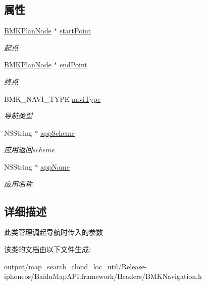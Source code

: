 \subsection*{属性}
\begin{DoxyCompactItemize}
\item 
\hypertarget{interface_b_m_k_navi_para_aafbed621fc51d1fe9a24b007f06635fb}{}\hyperlink{interface_b_m_k_plan_node}{B\+M\+K\+Plan\+Node} $\ast$ \hyperlink{interface_b_m_k_navi_para_aafbed621fc51d1fe9a24b007f06635fb}{start\+Point}\label{interface_b_m_k_navi_para_aafbed621fc51d1fe9a24b007f06635fb}

\begin{DoxyCompactList}\small\item\em 起点 \end{DoxyCompactList}\item 
\hypertarget{interface_b_m_k_navi_para_a6c47b9b500a1361c81843dde65b79928}{}\hyperlink{interface_b_m_k_plan_node}{B\+M\+K\+Plan\+Node} $\ast$ \hyperlink{interface_b_m_k_navi_para_a6c47b9b500a1361c81843dde65b79928}{end\+Point}\label{interface_b_m_k_navi_para_a6c47b9b500a1361c81843dde65b79928}

\begin{DoxyCompactList}\small\item\em 终点 \end{DoxyCompactList}\item 
\hypertarget{interface_b_m_k_navi_para_abbc3ff6ed83b98d211205ebf2153fe2b}{}B\+M\+K\+\_\+\+N\+A\+V\+I\+\_\+\+T\+Y\+P\+E \hyperlink{interface_b_m_k_navi_para_abbc3ff6ed83b98d211205ebf2153fe2b}{navi\+Type}\label{interface_b_m_k_navi_para_abbc3ff6ed83b98d211205ebf2153fe2b}

\begin{DoxyCompactList}\small\item\em 导航类型 \end{DoxyCompactList}\item 
\hypertarget{interface_b_m_k_navi_para_aa6d336d0e092b0624c49cacf73141bee}{}N\+S\+String $\ast$ \hyperlink{interface_b_m_k_navi_para_aa6d336d0e092b0624c49cacf73141bee}{app\+Scheme}\label{interface_b_m_k_navi_para_aa6d336d0e092b0624c49cacf73141bee}

\begin{DoxyCompactList}\small\item\em 应用返回scheme \end{DoxyCompactList}\item 
\hypertarget{interface_b_m_k_navi_para_a4c98f8aca9d18fd287e345aaffff4f1c}{}N\+S\+String $\ast$ \hyperlink{interface_b_m_k_navi_para_a4c98f8aca9d18fd287e345aaffff4f1c}{app\+Name}\label{interface_b_m_k_navi_para_a4c98f8aca9d18fd287e345aaffff4f1c}

\begin{DoxyCompactList}\small\item\em 应用名称 \end{DoxyCompactList}\end{DoxyCompactItemize}


\subsection{详细描述}
此类管理调起导航时传入的参数 

该类的文档由以下文件生成\+:\begin{DoxyCompactItemize}
\item 
output/map\+\_\+search\+\_\+cloud\+\_\+loc\+\_\+util/\+Release-\/iphoneos/\+Baidu\+Map\+A\+P\+I.\+framework/\+Headers/B\+M\+K\+Navigation.\+h\end{DoxyCompactItemize}
